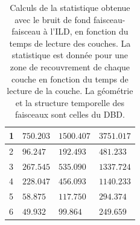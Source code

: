 \begin{table}[h]
\begin{tabular}{|l|l|l|l|}
1             & $750.203$           & $1500.407$      & $3751.017$        \\ \hline
2             & $96.247$            & $192.493$       & $481.233$         \\ \hline
3             & $267.545$             & $535.090$         & $1337.724$          \\ \hline
4             & $228.047$              & $456.093$          & $1140.233$           \\ \hline
5             & $58.875$              & $117.750$         & $294.374$           \\ \hline
6             & $49.932$              & $99.864$          & $249.659$           \\ \hline
\end{tabular}
\caption{Calculs de la statistique obtenue avec le bruit de fond faisceau-faisceau \`a l'ILD, en fonction du temps de lecture des couches. La statistique est donn\'ee pour une zone de recouvrement de chaque couche en fonction du temps de lecture de la couche. La g\'eom\'etrie et la structure temporelle des faisceaux sont celles du DBD.}
\label{tab:StatBruitFond}
\end{table}

